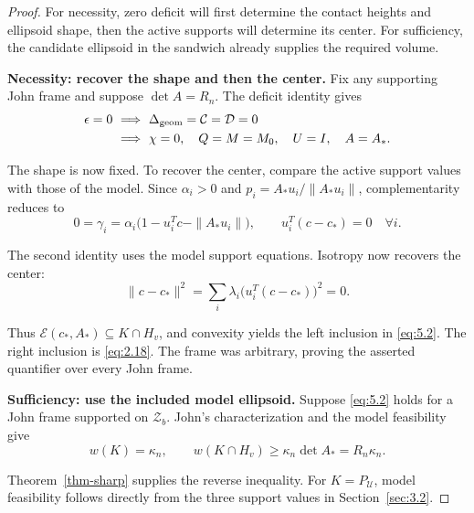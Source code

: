 \begin{proof}
For necessity, zero deficit will first determine the contact heights
and ellipsoid shape, then the active supports will determine its center.
For sufficiency, the candidate ellipsoid in the sandwich already supplies the
required volume.

\textbf{Necessity: recover the shape and then the center.} Fix any supporting John
frame and suppose $\det A=R_n$. The deficit identity gives
\begin{equation}\label{eq:5.3}
\begin{aligned}
\epsilon=0&\ \Longrightarrow\ \Delta_{\rm geom}=\mathcal C=\mathcal D=0\\
&\ \Longrightarrow\ \chi=0,\quad Q=M=M_0,\quad U=I,\quad A=A_*.
\end{aligned}
\end{equation}

The shape is now fixed. To recover the center, compare the active support
values with those of the model. Since $\alpha_i>0$ and
$p_i=A_*u_i/\|A_*u_i\|$, complementarity reduces to
\begin{equation}\label{eq:5.4}
0=\gamma_i
=\alpha_i\bigl(1-u_i^Tc-\|A_*u_i\|\bigr),
\qquad
u_i^T(c-c_*)=0\quad\forall i.
\end{equation}

The second identity uses the model support equations. Isotropy now recovers the center:
\begin{equation}\label{eq:5.5}
\|c-c_*\|^2
=\sum_i\lambda_i\bigl(u_i^T(c-c_*)\bigr)^2=0.
\end{equation}

Thus $\mathcal E(c_*,A_*)\subseteq K\cap H_v$, and convexity yields the left inclusion in \eqref{eq:5.2}. The right inclusion is \eqref{eq:2.18}. The frame was arbitrary, proving the asserted quantifier over every John frame.

\textbf{Sufficiency: use the included model ellipsoid.} Suppose \eqref{eq:5.2} holds for a
John frame supported on $\mathcal Z_b$. John's characterization and the model
feasibility give
\begin{equation}\label{eq:5.6}
w(K)=\kappa_n,\qquad
w(K\cap H_v)\ge\kappa_n\det A_*=R_n\kappa_n.
\end{equation}

Theorem~\ref{thm-sharp} supplies the reverse inequality. For $K=P_{\mathcal U}$, model feasibility follows directly from the three support values in Section~\ref{sec:3.2}. 
\end{proof}

